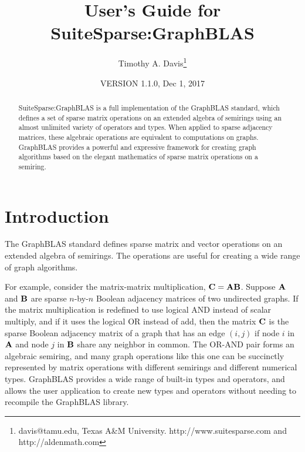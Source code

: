 \documentclass[12pt]{article}
\title{User's Guide for SuiteSparse:GraphBLAS}
\author{Timothy A. Davis\thanks{
davis@tamu.edu,
Texas A\&M University. \newline
http://www.suitesparse.com and http://aldenmath.com
}}
\date{VERSION 1.1.0, Dec 1, 2017}
\begin{document}
\maketitle

\begin{abstract}
SuiteSparse:GraphBLAS is a full implementation of the GraphBLAS standard,
which defines a set of sparse matrix operations on an extended algebra of
semirings using an almost unlimited variety of operators and types.  When
applied to sparse adjacency matrices, these algebraic operations are equivalent
to computations on graphs.  GraphBLAS provides a powerful and expressive
framework for creating graph algorithms based on the elegant mathematics of
sparse matrix operations on a semiring.
\end{abstract}

\maketitle

\newpage
{\footnotesize
\tableofcontents
}

\newpage
\section{Introduction} %
\label{intro}

The GraphBLAS standard defines sparse matrix and vector operations on an
extended algebra of semirings.  The operations are useful for creating a wide
range of graph algorithms.

For example, consider the matrix-matrix multiplication, ${\bf C=AB}$.  Suppose
${\bf A}$ and ${\bf B}$ are sparse $n$-by-$n$ Boolean adjacency matrices of two
undirected graphs.  If the matrix multiplication is redefined to use logical
AND instead of scalar multiply, and if it uses the logical OR instead of add,
then the matrix ${\bf C}$ is the sparse Boolean adjacency matrix of a graph
that has an edge $(i,j)$ if node $i$ in ${\bf A}$ and node $j$ in ${\bf B}$
share any neighbor in common.  The OR-AND pair forms an algebraic semiring, and
many graph operations like this one can be succinctly represented by matrix
operations with different semirings and different numerical types.  GraphBLAS
provides a wide range of built-in types and operators, and allows the user
application to create new types and operators without needing to recompile the
GraphBLAS library.
\end{document}
